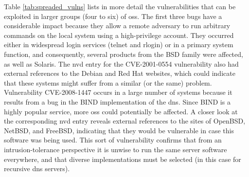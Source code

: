 Table \ref{tab:spreaded_vulns} lists in more detail the vulnerabilities that can be exploited in larger groups (four to six) of \glspl{os}. 
The first three bugs have a considerable impact because they allow a remote adversary to run arbitrary commands on the local system using a high-privilege account. 
They occurred either in widespread login services (telnet and rlogin) or in a primary system function, and consequently, several products from the BSD family were affected, as well as Solaris. 
The \gls{nvd} entry for the CVE-2001-0554 vulnerability also had external references to the Debian and Red Hat websites, which could indicate that these systems might suffer from a similar (or the same) problem. 
Vulnerability CVE-2008-1447 occurs in a large number of systems because it results from a bug in the BIND implementation of the \gls{dns}. Since BIND is a highly popular service, more \glspl{os} could potentially be affected. 
A closer look at the corresponding \gls{nvd} entry reveals external references to the sites of OpenBSD, NetBSD, and FreeBSD, indicating that they would be vulnerable in case this software was being used. 
This sort of vulnerability confirms that from an intrusion-tolerance perspective it is unwise to run the same server software everywhere, and that diverse implementations must be selected (in this case for recursive \gls{dns} servers).


